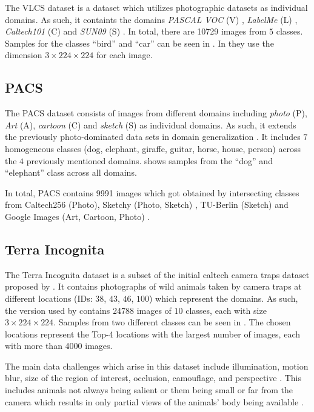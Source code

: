 The VLCS dataset \citep{FangXR13} is a dataset which utilizes photographic datasets as individual domains. As such, it containts the domains \emph{PASCAL VOC} (V) \citep{EveringhamGWWZ10}, \emph{LabelMe} (L) \citep{RussellTMF08}, \emph{Caltech101} (C) \citep{Fei-FeiFP07} and \emph{SUN09} (S) \citep{ChoiLTW10}. In total, there are \num{10729} images from $5$ classes. Samples for the classes ``bird'' and ``car'' can be seen in . In \citet{gulrajani2020search} they use the dimension $3 \times 224 \times 224$ for each image. 

\subsection{PACS}
The PACS dataset \citep{LiYSH17} consists of images from different domains including \emph{photo} (P), \emph{Art} (A), \emph{cartoon} (C) and \emph{sketch} (S) as individual domains. As such, it extends the previously photo-dominated data sets in domain generalization \citep{LiYSH17}. It includes $7$ homogeneous classes (dog, elephant, giraffe, guitar, horse, house, person) across the $4$ previously mentioned domains.  shows samples from the ``dog'' and ``elephant'' class across all domains. 

In total, PACS contains \num{9991} images which got obtained by intersecting classes from Caltech256 (Photo), Sketchy (Photo, Sketch) \citep{SangkloyBHH16}, TU-Berlin (Sketch) \citep{EitzHA12} and Google Images (Art, Cartoon, Photo) \citep{LiYSH17}.


\subsection{Terra Incognita}
The Terra Incognita dataset is a subset of the initial caltech camera traps dataset proposed by \citet{BeeryHP18}. It contains photographs of wild animals taken by camera traps at different locations (IDs: $38$, $43$, $46$, $100$) which represent the domains. As such, the version used by \citet{gulrajani2020search} contains \num{24788} images of $10$ classes, each with size $3\times 224 \times 224$. Samples from two different classes can be seen in . The chosen locations represent the Top-4 locations with the largest number of images, each with more than \num{4000} images. 

The main data challenges which arise in this dataset include illumination, motion blur, size of the region of interest, occlusion, camouflage, and perspective \citep{BeeryHP18}. This includes animals not always being salient or them being small or far from the camera which results in only partial views of the animals' body being available \citep{BeeryHP18}. 


